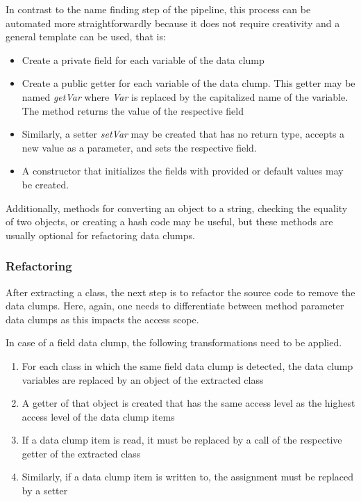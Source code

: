In contrast to the name finding step of the pipeline, this process can be automated more straightforwardly because it does not require creativity and a general template can be used, that is:
\begin{itemize}
    \item Create a private field for each variable of the data clump
    \item Create a public getter for each variable of the data clump. This getter may be named \textit{getVar} where \textit{Var} is replaced by the capitalized name of the variable. The method returns the value of the respective field
    \item Similarly, a setter \textit{setVar} may be created that has no return type, accepts a new value as a parameter, and sets the respective field. 
    \item A constructor that initializes the fields with provided or default values may be created. 
\end{itemize}

Additionally, methods for converting an object to a string, checking the equality of two objects, or creating a hash code may be useful, but these methods are usually optional for refactoring data clumps. 


\subsubsection{Refactoring}
After extracting a class, the next step is to refactor the source code to remove the data clumps. Here, again, one needs to differentiate between method parameter data clumps as this impacts the access scope. 

In case of a field data clump, the following transformations need to be applied.

\begin{enumerate}
    \item For each class in which the same field data clump is detected, the data clump variables are replaced by an object of the extracted class
    \item A getter of that object is created that has the same access level as the highest access level of the data clump items
    \item If a data clump item is read, it must be replaced by a call of the respective getter of the extracted class
    \item Similarly, if a data clump item is written to, the assignment must be replaced by a setter
\end{enumerate}




